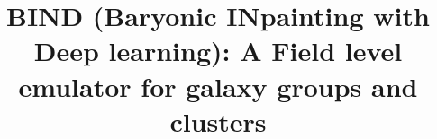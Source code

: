 \documentclass[linenumbers,trackchanges, twocolumn]{aastex701}
\begin{document}
\title{BIND (Baryonic INpainting with Deep learning): A Field level emulator for galaxy groups and clusters}

\end{document}
